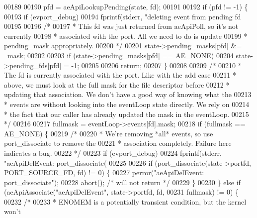 \begin{DoxyCode}
{{{{{{00189 
00190     pfd = aeApiLookupPending(state, fd);
00191 
00192     \textcolor{keywordflow}{if} (pfd != -1) \{
00193         \textcolor{keywordflow}{if} (evport\_debug)
00194             fprintf(stderr, \textcolor{stringliteral}{"deleting event from pending fd %
00195 
00196         \textcolor{comment}{/*}
00197 \textcolor{comment}{         * This fd was just returned from aeApiPoll, so it's not currently}
00198 \textcolor{comment}{         * associated with the port.  All we need to do is update}
00199 \textcolor{comment}{         * pending\_mask appropriately.}
00200 \textcolor{comment}{         */}
00201         state->pending\_masks[pfd] &= ~mask;
00202 
00203         \textcolor{keywordflow}{if} (state->pending\_masks[pfd] == AE\_NONE)
00204             state->pending\_fds[pfd] = -1;
00205 
00206         \textcolor{keywordflow}{return};
00207     \}
00208 
00209     \textcolor{comment}{/*}
00210 \textcolor{comment}{     * The fd is currently associated with the port.  Like with the add case}
00211 \textcolor{comment}{     * above, we must look at the full mask for the file descriptor before}
00212 \textcolor{comment}{     * updating that association.  We don't have a good way of knowing what the}
00213 \textcolor{comment}{     * events are without looking into the eventLoop state directly.  We rely on}
00214 \textcolor{comment}{     * the fact that our caller has already updated the mask in the eventLoop.}
00215 \textcolor{comment}{     */}
00216 
00217     fullmask = eventLoop->events[fd].mask;
00218     \textcolor{keywordflow}{if} (fullmask == AE\_NONE) \{
00219         \textcolor{comment}{/*}
00220 \textcolor{comment}{         * We're removing *all* events, so use port\_dissociate to remove the}
00221 \textcolor{comment}{         * association completely.  Failure here indicates a bug.}
00222 \textcolor{comment}{         */}
00223         \textcolor{keywordflow}{if} (evport\_debug)
00224             fprintf(stderr, \textcolor{stringliteral}{"aeApiDelEvent: port\_dissociate(%
00225 
00226         \textcolor{keywordflow}{if} (port\_dissociate(state->portfd, PORT\_SOURCE\_FD, fd) != 0) \{
00227             perror(\textcolor{stringliteral}{"aeApiDelEvent: port\_dissociate"});
00228             abort(); \textcolor{comment}{/* will not return */}
00229         \}
00230     \} \textcolor{keywordflow}{else} \textcolor{keywordflow}{if} (aeApiAssociate(\textcolor{stringliteral}{"aeApiDelEvent"}, state->portfd, fd,
00231         fullmask) != 0) \{
00232         \textcolor{comment}{/*}
00233 \textcolor{comment}{         * ENOMEM is a potentially transient condition, but the kernel won't}
}}}}}}}}
\end{DoxyCode}
